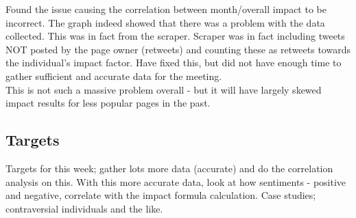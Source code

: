 Found the issue causing the correlation between month/overall impact to be incorrect. The graph indeed showed that there was a problem with the data collected. This was in fact from the scraper. Scraper was in fact including tweets NOT posted by the page owner (retweets) and counting these as retweets towards the individual's impact factor. Have fixed this, but did not have enough time to gather sufficient and accurate data for the meeting.\\

\noindent This is not such a massive problem overall - but it will have largely skewed impact results for less popular pages in the past.

\subsection{Targets}

Targets for this week; gather lots more data (accurate) and do the correlation analysis on this. With this more accurate data, look at how sentiments - positive and negative, correlate with the impact formula calculation. Case studies; contraversial individuals and the like. 


